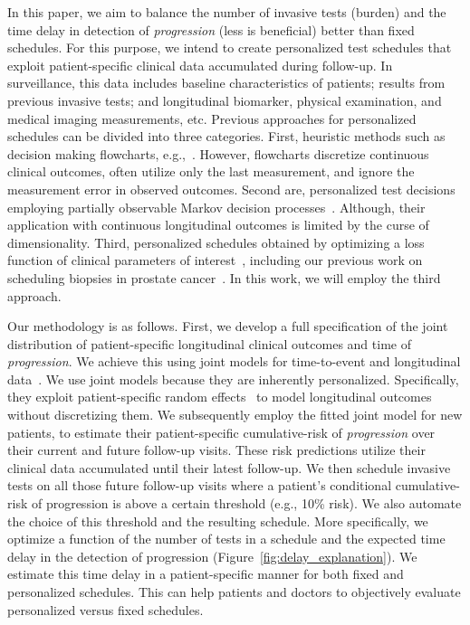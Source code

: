 In this paper, we aim to balance the number of invasive tests (burden) and the time delay in detection of \textit{progression} (less is beneficial) better than fixed schedules. For this purpose, we intend to create personalized test schedules that exploit patient-specific clinical data accumulated during follow-up. In surveillance, this data includes baseline characteristics of patients; results from previous invasive tests; and longitudinal biomarker, physical examination, and medical imaging measurements, etc. Previous approaches for personalized schedules can be divided into three categories. First, heuristic methods such as decision making flowcharts, e.g.,~\citet{bokhorst2015compliance}. However, flowcharts discretize continuous clinical outcomes, often utilize only the last measurement, and ignore the measurement error in observed outcomes. Second are, personalized test decisions employing partially observable Markov decision processes~\citep{alagoz2010operations, steimle2017markov}. Although, their application with continuous longitudinal outcomes is limited by the curse of dimensionality. Third, personalized schedules obtained by optimizing a loss function of clinical parameters of interest~\citep{bebu2017optimal,rizopoulos2015personalized}, including our previous work on scheduling biopsies in prostate cancer~\citep{tomer2019personalized}. In this work, we will employ the third approach.

Our methodology is as follows. First, we develop a full specification of the joint distribution of patient-specific longitudinal clinical outcomes and time of \textit{progression}. We achieve this using joint models for time-to-event and longitudinal data~\citep{tsiatis2004joint,rizopoulos2012joint}. We use joint models because they are inherently personalized. Specifically, they exploit patient-specific random effects~\citep{laird1982random} to model longitudinal outcomes without discretizing them. We subsequently employ the fitted joint model for new patients, to estimate their patient-specific cumulative-risk of \textit{progression} over their current and future follow-up visits. These risk predictions utilize their clinical data accumulated until their latest follow-up. We then schedule invasive tests on all those future follow-up visits where a patient's conditional cumulative-risk of progression is above a certain threshold (e.g., 10\% risk). We also automate the choice of this threshold and the resulting schedule. More specifically, we optimize a function of the number of tests in a schedule and the expected time delay in the detection of progression (Figure~\ref{fig:delay_explanation}). We estimate this time delay in a patient-specific manner for both fixed and personalized schedules. This can help patients and doctors to objectively evaluate personalized versus fixed schedules.


